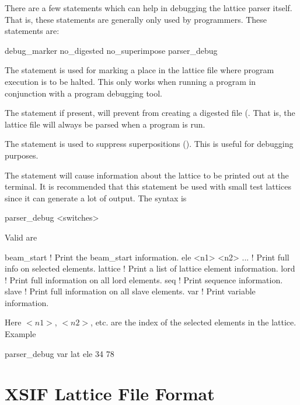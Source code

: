 {{There are a few statements
which can help in debugging the \bmad lattice parser
itself. That is, these statements are generally only used by programmers.
These statements are:
\begin{example}
  debug_marker
  no_digested
  no_superimpose
  parser_debug
\end{example}

The  statement is used for marking a place in the lattice file
where program execution is to be halted. This only works when running
a program in conjunction with a program debugging tool. 

The  statement if present, will prevent \bmad from 
creating a digested file (. That is, the lattice file will always
be parsed when a program is run.

The  statement is used to suppress superpositions
(). This is useful for debugging purposes.

The  statement will cause information about the
lattice to be printed out at the terminal. It is recommended that this
statement be used with small test lattices since it can generate a lot
of output. The syntax is
\begin{example}
  parser_debug <switches>
\end{example}
Valid  are
\begin{example}
  beam_start          ! Print the beam_start information.
  ele <n1> <n2> ...   ! Print full info on selected elements.
  lattice             ! Print a list of lattice element information.
  lord                ! Print full information on all lord elements.
  seq                 ! Print sequence information.
  slave               ! Print full information on all slave elements.
  var                 ! Print variable information.
\end{example}
Here $<n1>$, $<n2>$, etc. are the index of the selected elements in
the lattice.  Example
\begin{example}
  parser_debug var lat ele 34 78
\end{example}

\section{XSIF Lattice File Format}
\label{s:xsif}

}}

